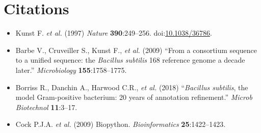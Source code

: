 \documentclass[11pt,letterpaper]{article}
\begin{document}
\section{Citations}

\begin{itemize}[nosep]
\item Kunst F. \emph{et al.} (1997) \emph{Nature} \textbf{390}:249--256. doi:\href{https://doi.org/10.1038/36786}{10.1038/36786}.
\item Barbe V., Cruveiller S., Kunst F., \emph{et al.} (2009) ``From a consortium sequence to a unified sequence: the \textit{Bacillus subtilis} 168 reference genome a decade later.'' \emph{Microbiology} \textbf{155}:1758--1775.
\item Borriss R., Danchin A., Harwood C.R., \emph{et al.} (2018) ``\textit{Bacillus subtilis}, the model Gram-positive bacterium: 20 years of annotation refinement.'' \emph{Microb Biotechnol} \textbf{11}:3--17.
\item Cock P.J.A. \emph{et al.} (2009) Biopython. \emph{Bioinformatics} \textbf{25}:1422--1423.
\end{itemize}
\end{document}
